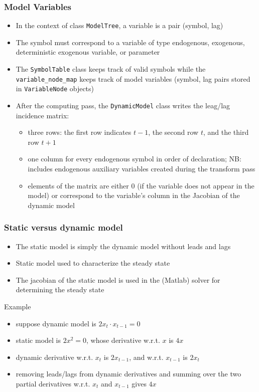\documentclass{beamer}
\begin{document}
\begin{frame}
  \frametitle{Model Variables}
  \begin{itemize}
  \item In the context of class \texttt{ModelTree}, a \alert{variable} is a pair (symbol, lag)
  \item The symbol must correspond to a variable of type endogenous, exogenous, deterministic exogenous variable, or parameter
  \item The \texttt{SymbolTable} class keeps track of valid symbols while the \texttt{variable\_node\_map} keeps track of model variables (symbol, lag pairs stored in \texttt{VariableNode} objects)
  \item After the computing pass, the \texttt{DynamicModel} class writes the leag/lag incidence matrix:
    \begin{itemize}
    \item three rows: the first row indicates $t-1$, the second row $t$, and the third row $t+1$
    \item one column for every endogenous symbol in order of declaration; NB: includes endogenous auxiliary variables created during the transform pass
    \item elements of the matrix are either 0 (if the variable does not appear in the model) or correspond to the variable's column in the Jacobian of the dynamic model
    \end{itemize}
  \end{itemize}
\end{frame}

\begin{frame}
  \frametitle{Static versus dynamic model}
  \begin{itemize}
  \item The static model is simply the dynamic model without leads and lags
  \item Static model used to characterize the steady state
  \item The jacobian of the static model is used in the (Matlab) solver for determining the steady state
  \end{itemize}
  \begin{block}{Example}
    \begin{itemize}
    \item suppose dynamic model is $2x_t \cdot x_{t-1} = 0$
    \item static model is $2x^2 = 0$, whose derivative w.r.t. $x$ is $4x$
    \item dynamic derivative w.r.t. $x_t$ is $2x_{t-1}$, and w.r.t. $x_{t-1}$ is $2x_t$
    \item removing leads/lags from dynamic derivatives and summing over the two partial derivatives w.r.t. $x_t$ and $x_{t-1}$ gives $4x$
    \end{itemize}
  \end{block}
\end{frame}
\end{document}
